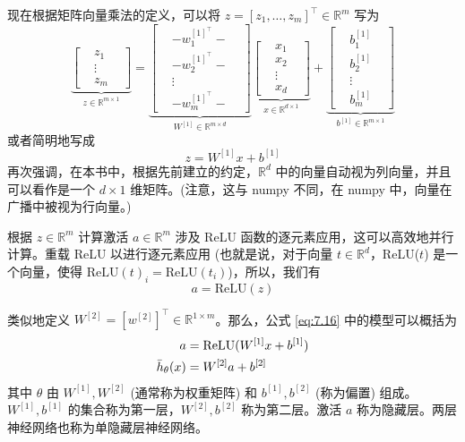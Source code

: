 现在根据矩阵向量乘法的定义，可以将 $z = [z_1, \dots, z_m]^\top \in \mathbb{R}^m$ 写为
\begin{equation}
    \underbrace{\begin{bmatrix}
    & z_1 & \\
    & \vdots & \\
    & z_m &
    \end{bmatrix}}_{z \in \mathbb{R}^{m \times 1}} = \underbrace{\begin{bmatrix}
    & - w_1^{[1]^\top} - & \\
    & - w_2^{[1]^\top} - & \\
    & \vdots & \\
    & - w_m^{[1]^\top} - &
    \end{bmatrix}}_{W^{[1]} \in \mathbb{R}^{m \times d}} \underbrace{\begin{bmatrix}
    & x_1 & \\
    & x_2 & \\
    & \vdots & \\
    & x_d &
    \end{bmatrix}}_{x \in \mathbb{R}^{d \times 1}} + \underbrace{\begin{bmatrix}
    & b_1^{[1]} & \\
    & b_2^{[1]} & \\
    & \vdots & \\
    & b_m^{[1]} &
    \end{bmatrix}}_{b^{[1]} \in \mathbb{R}^{m \times 1}}
    \label{eq:7.18}
\end{equation}
或者简明地写成
\begin{equation}
    z = W^{[1]} x + b^{[1]}
    \label{eq:7.19}
\end{equation}
再次强调，在本书中，根据先前建立的约定，$\mathbb{R}^d$ 中的向量自动视为列向量，并且可以看作是一个 $d \times 1$ 维矩阵。(注意，这与 numpy 不同，在 numpy 中，向量在广播中被视为行向量。)

根据 $z \in \mathbb{R}^m$ 计算激活 $a \in \mathbb{R}^m$ 涉及 ReLU 函数的逐元素应用，这可以高效地并行计算。重载 ReLU 以进行逐元素应用 (也就是说，对于向量 $t \in \mathbb{R}^d$，ReLU($t$) 是一个向量，使得 $\text{ReLU}(t)_i = \text{ReLU}(t_i)$)，所以，我们有
\begin{equation}
    a = \text{ReLU}(z)
    \label{eq:7.20}
\end{equation}

类似地定义 $W^{[2]} = [w^{[2]}]^\top \in \mathbb{R}^{1 \times m}$。那么，公式 \eqref{eq:7.16} 中的模型可以概括为
\begin{align}
    a &= \text{ReLU}(W^{[1]} x + b^{[1]}) \notag \\
    \bar{h}_\theta(x) &= W^{[2]} a + b^{[2]}
    \label{eq:7.21}
\end{align}
其中 $\theta$ 由 $W^{[1]}, W^{[2]}$ (通常称为权重矩阵) 和 $b^{[1]}, b^{[2]}$ (称为偏置) 组成。$W^{[1]}, b^{[1]}$ 的集合称为第一层，$W^{[2]}, b^{[2]}$ 称为第二层。激活 $a$ 称为隐藏层。两层神经网络也称为单隐藏层神经网络。


